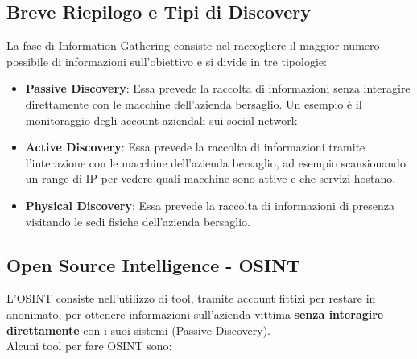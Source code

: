 \documentclass{article}
\begin{document}
\subsection{Breve Riepilogo e Tipi di Discovery}
La fase di Information Gathering consiste nel raccogliere il maggior numero possibile di informazioni sull'obiettivo e si divide in tre tipologie:
\begin{itemize}
    \item \textbf{Passive Discovery}: Essa prevede la raccolta di informazioni senza interagire direttamente con le macchine dell’azienda bersaglio. Un esempio è il monitoraggio degli account aziendali sui social network

    \item \textbf{Active Discovery}: Essa prevede la raccolta di informazioni tramite l’interazione con le macchine dell’azienda bersaglio, ad esempio scansionando un range di IP per vedere quali macchine sono attive e che servizi hostano.

    \item \textbf{Physical Discovery}: Essa prevede la raccolta di informazioni di presenza visitando le sedi fisiche dell'azienda bersaglio.
\end{itemize}

\subsection{Open Source Intelligence - OSINT}
L'OSINT consiste nell'utilizzo di tool, tramite account fittizi per restare in anonimato, per ottenere informazioni sull'azienda vittima \textbf{senza interagire direttamente} con i suoi sistemi (Passive Discovery).\\
Alcuni tool per fare OSINT sono:
\end{document}
